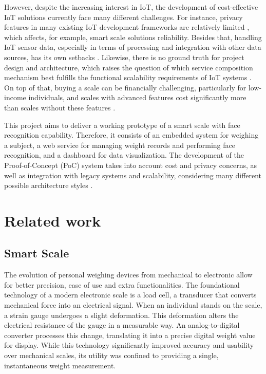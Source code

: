 \documentclass[12pt]{article}
\begin{document}
However, despite the increasing interest in IoT, the development of cost-effective IoT solutions currently face many different challenges. For instance, privacy features in many existing IoT development frameworks are relatively limited \cite{jin2020privacy}, which affects, for example, smart scale solutions reliability. Besides that, handling IoT sensor data, especially in terms of processing and integration with other data sources, has its own setbacks \cite{challenges2024nwamaka}. Likewise, there is no ground truth for project design and architecture, which raises the question of which service composition mechanism best fulfills the functional scalability requirements of IoT systems \cite{evaluation2020kung}. On top of that, buying a scale can be financially challenging, particularly for low-income individuals, and scales with advanced features cost significantly more than scales without these features \cite{affordability2021park}.


This project aims to deliver a working prototype of a smart scale with face recognition capability. Therefore, it consists of an embedded system for weighing a subject, a web service for managing weight records and performing face recognition, and a dashboard for data visualization. The development of the Proof-of-Concept (PoC) system takes into account cost and privacy concerns, as well as integration with legacy systems and scalability, considering many different possible architecture styles \cite{dimartino2018iot}.

\section{Related work}

\subsection{Smart Scale}

The evolution of personal weighing devices from mechanical to electronic allow for better precision, ease of use and extra functionalities. The foundational technology of a modern electronic scale is a load cell, a transducer that converts mechanical force into an electrical signal. When an individual stands on the scale, a strain gauge undergoes a slight deformation. This deformation alters the electrical resistance of the gauge in a measurable way. An analog-to-digital converter processes this change, translating it into a precise digital weight value for display. While this technology significantly improved accuracy and usability over mechanical scales, its utility was confined to providing a single, instantaneous weight measurement.
\end{document}
